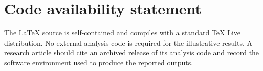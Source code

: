\section*{Code availability statement}

The LaTeX source is self-contained and compiles with a standard TeX Live
distribution. No external analysis code is required for the illustrative
results. A research article should cite an archived release of its analysis code
and record the software environment used to produce the reported outputs.
